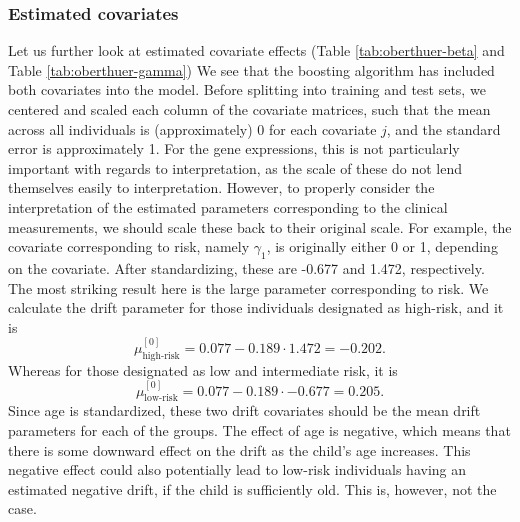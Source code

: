\subsubsection{Estimated covariates}
Let us further look at estimated covariate effects (Table \ref{tab:oberthuer-beta} and Table \ref{tab:oberthuer-gamma})
We see that the boosting algorithm has included both covariates into the model.
Before splitting into training and test sets, we centered and scaled each column of the covariate matrices, such that the mean across all individuals is (approximately) 0 for each covariate $j$,
and the standard error is approximately 1.
For the gene expressions, this is not particularly important with regards to interpretation, as the scale of these do not lend themselves easily to interpretation.
However, to properly consider the interpretation of the estimated parameters corresponding to the clinical measurements, we should
scale these back to their original scale.
For example, the covariate corresponding to risk, namely $\gamma_1$, is originally either 0 or 1, depending on the covariate.
After standardizing, these are -0.677 and 1.472, respectively.
The most striking result here is the large parameter corresponding to risk.
We calculate the drift parameter for those individuals designated as high-risk, and it is
\begin{equation*}
    \mu^{[0]}_{\text{high-risk}}=0.077-0.189\cdot1.472=-0.202.
\end{equation*}
Whereas for those designated as low and intermediate risk, it is
\begin{equation*}
    \mu^{[0]}_{\text{low-risk}}=0.077-0.189\cdot-0.677=0.205.
\end{equation*}
Since age is standardized, these two drift covariates should be the mean drift parameters for each of the groups.
The effect of age is negative, which means that there is some downward effect on the drift as the child's age increases.
This negative effect could also potentially lead to low-risk individuals having an estimated negative drift, if the child is sufficiently old.
This is, however, not the case.
